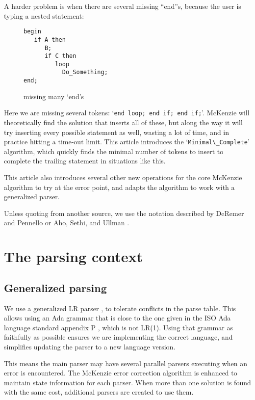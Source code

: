 \documentclass[authordraft]{acmart}
\newcommand{\code}[1]{`\lstinline|#1|'}
\begin{document}
A harder problem is when there are several missing ``end''s, because
the user is typing a nested statement:
\begin{figure}[H]
\begin{lstlisting}
begin
   if A then
      B;
      if C then
         loop
           Do_Something;
end;
\end{lstlisting}
\caption{missing many `end's}
\label{ex:min_com_if_if_loop}
\end{figure}

Here we are missing several tokens: \code{end loop; end if; end if;}.
McKenzie will theoretically find the solution that inserts all of
these, but along the way it will try inserting every possible
statement as well, wasting a lot of time, and in practice hitting a
time-out limit. This article introduces the \code{Minimal\_Complete}
algorithm, which quickly finds the minimal number of tokens to insert
to complete the trailing statement in situations like this.

This article also introduces several other new operations for the core
McKenzie algorithm to try at the error point, and adapts the algorithm
to work with a generalized parser.

Unless quoting from another source, we use the notation described by
DeRemer and Pennello \citep{DeRemer 1982} or Aho, Sethi, and Ullman
\citep{dragon}.

\section{The parsing context}
\subsection{Generalized parsing}
We use a generalized LR parser \citet{Tomita 1986}, to tolerate
conflicts in the parse table. This allows using an Ada grammar that is
close to the one given in the ISO Ada language standard appendix P
\citep{Ada 2012}, which is not LR(1). Using that grammar as faithfully
as possible ensures we are implementing the correct language, and
simplifies updating the parser to a new language version.

This means the main parser may have several parallel parsers executing
when an error is encountered. The McKenzie error correction algorithm
is enhanced to maintain state information for each parser. When more
than one solution is found with the same cost, additional parsers are
created to use them.
\end{document}
